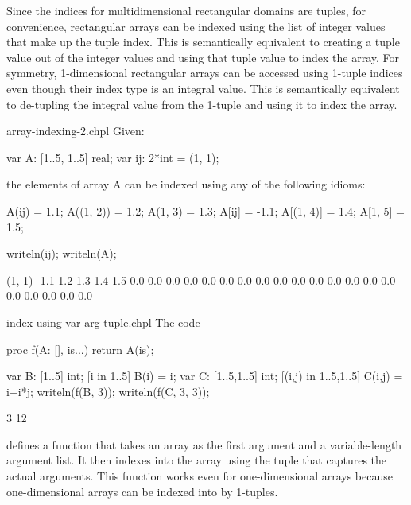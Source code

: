 Since the indices for multidimensional rectangular domains are tuples,
for convenience, rectangular arrays can be indexed using the list of
integer values that make up the tuple index.  This is semantically
equivalent to creating a tuple value out of the integer values and
using that tuple value to index the array.  For symmetry,
1-dimensional rectangular arrays can be accessed using 1-tuple indices
even though their index type is an integral value.  This is
semantically equivalent to de-tupling the integral value from the
1-tuple and using it to index the array.

\begin{chapelexample}{array-indexing-2.chpl}
Given:
\begin{chapel}
var A: [1..5, 1..5] real;
var ij: 2*int = (1, 1);
\end{chapel}
the elements of array A can be indexed using any of the following
idioms:
\begin{chapel}
A(ij) = 1.1;
A((1, 2)) = 1.2;
A(1, 3) = 1.3;
A[ij] = -1.1;
A[(1, 4)] = 1.4;
A[1, 5] = 1.5;
\end{chapel}
\begin{chapelpost}
writeln(ij);
writeln(A);
\end{chapelpost}
\begin{chapeloutput}
(1, 1)
-1.1 1.2 1.3 1.4 1.5
0.0 0.0 0.0 0.0 0.0
0.0 0.0 0.0 0.0 0.0
0.0 0.0 0.0 0.0 0.0
0.0 0.0 0.0 0.0 0.0
\end{chapeloutput}
\end{chapelexample}

\begin{chapelexample}{index-using-var-arg-tuple.chpl}
The code
\begin{chapel}
proc f(A: [], is...)
  return A(is);
\end{chapel}
\begin{chapelpost}
var B: [1..5] int;
[i in 1..5] B(i) = i;
var C: [1..5,1..5] int;
[(i,j) in {1..5,1..5}] C(i,j) = i+i*j;
writeln(f(B, 3));
writeln(f(C, 3, 3));
\end{chapelpost}
\begin{chapeloutput}
3
12
\end{chapeloutput}
defines a function that takes an array as the first argument and a
variable-length argument list.  It then indexes into the array using
the tuple that captures the actual arguments.  This function works
even for one-dimensional arrays because one-dimensional arrays can be
indexed into by 1-tuples.
\end{chapelexample}

